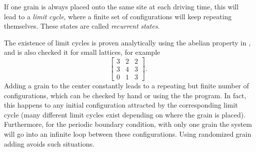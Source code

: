 \vspace{1em}

If one grain is always placed onto the same site at each driving time, this will lead to a \emph{limit cycle}, where a finite set of configurations will keep repeating themselves. These states are called \emph{recurrent states}.



The existence of limit cycles is proven analytically using the abelian property in \cite{deepak}, and is also checked it for small lattices, for example
\[ \left[ \begin{array}{ccc}
3 & 2 & 2 \\
3 & 4 & 3 \\
0 & 1 & 3 \end{array} \right] .
\]
Adding a grain to the center constantly leads to a repeating but finite number of configurations, which can be checked by hand or using the the  program. In fact, this happens to any initial configuration attracted by the corresponding limit cycle (many different limit cycles exist depending on where the grain is placed).
Furthermore, for the periodic boundary condition, with only one grain the system will go into an infinite loop between these configurations. Using randomized grain adding avoids such situations.











